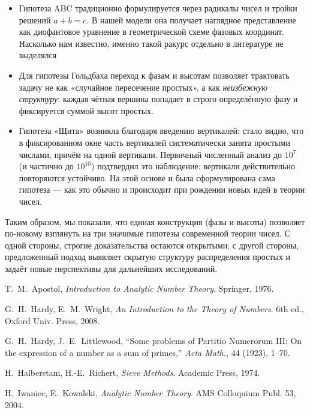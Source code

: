 \documentclass[12pt,a4paper]{article}
\theoremstyle{definition}
\theoremstyle{plain}
\theoremstyle{remark}
\begin{document}
\begin{itemize}
  \item Гипотеза ABC традиционно формулируется через радикалы чисел и тройки решений $a+b=c$. В нашей модели она получает наглядное представление как диофантовое уравнение в геометрической схеме фазовых координат. Насколько нам известно, именно такой ракурс отдельно в литературе не выделялся
  \item Для гипотезы Гольдбаха переход к фазам и высотам позволяет трактовать задачу 
  не как «случайное пересечение простых», а как \emph{неизбежную структуру}: 
  каждая чётная вершина попадает в строго определённую фазу и фиксируется суммой высот простых.
  \item Гипотеза «Щита» возникла благодаря введению вертикалей: 
  стало видно, что в фиксированном окне часть вертикалей систематически занята простыми числами, 
  причём на одной вертикали. Первичный численный анализ до $10^7$ (и частично до $10^{10}$) 
  подтвердил это наблюдение: вертикали действительно повторяются устойчиво. 
  На этой основе и была сформулирована сама гипотеза — как это обычно и происходит 
  при рождении новых идей в теории чисел.
\end{itemize}

Таким образом, мы показали, что единая конструкция (фазы и высоты) позволяет по-новому взглянуть 
на три значимые гипотезы современной теории чисел. С одной стороны, строгие доказательства остаются открытыми; 
с другой стороны, предложенный подход выявляет скрытую структуру распределения простых и задаёт 
новые перспективы для дальнейших исследований.

\begin{thebibliography}{99}

T.~M.~Apostol, \emph{Introduction to Analytic Number Theory}. Springer, 1976.

G.~H.~Hardy, E.~M.~Wright, \emph{An Introduction to the Theory of Numbers}. 6th ed., Oxford Univ. Press, 2008.

G.~H.~Hardy, J.~E.~Littlewood, ``Some problems of Partitio Numerorum III: On the expression of a number as a sum of primes,'' 
\emph{Acta Math.}, 44 (1923), 1–70.

H.~Halberstam, H.-E.~Richert, \emph{Sieve Methods}. Academic Press, 1974.

H.~Iwaniec, E.~Kowalski, \emph{Analytic Number Theory}. AMS Colloquium Publ. 53, 2004.

\end{thebibliography}
\end{document}
